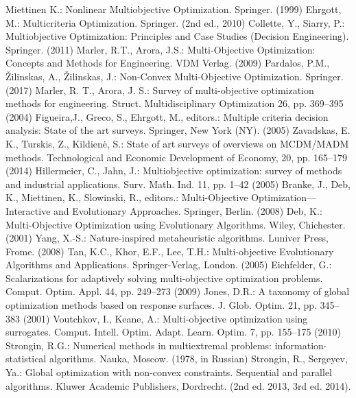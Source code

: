 \documentclass[smallextended]{svjour3}       %
\begin{document}
\begin{thebibliography}{}
%
%

 Miettinen K.: Nonlinear Multiobjective Optimization. Springer. (1999)
 Ehrgott, M.: Multicriteria Optimization. Springer. (2nd ed., 2010)
 Collette, Y., Siarry, P.: Multiobjective Optimization: Principles and Case Studies (Decision Engineering). Springer. (2011)
 Marler, R.T., Arora, J.S.: Multi-Objective Optimization: Concepts and Methods for Engineering. VDM Verlag. (2009)
 Pardalos, P.M., {\v Z}ilinskas, A., {\v Z}ilinskas, J.: Non-Convex Multi-Objective Optimization. Springer. (2017)
 Marler, R. T., Arora, J. S.: Survey of multi-objective optimization methods for engineering. Struct. Multidisciplinary Optimization 26, pp. 369--395 (2004)
 Figueira,J., Greco, S., Ehrgott, M., editors.: Multiple criteria decision analysis: State of the art surveys. Springer, New York (NY). (2005)
 Zavadskas, E. K., Turskis, Z., Kildien\.e, S.: State of art surveys of overviews on MCDM/MADM methods. Technological and Economic Development of Economy, 20, pp. 165--179 (2014)
 Hillermeier, C., Jahn, J.: Multiobjective optimization: survey of methods and industrial applications. Surv. Math. Ind. 11, pp. 1--42 (2005)
 Branke, J., Deb, K., Miettinen, K., Slowinski, R., editors.: Multi-Objective Optimization—Interactive and Evolutionary Approaches. Springer, Berlin. (2008)
 Deb, K.: Multi-Objective Optimization using Evolutionary Algorithms. Wiley, Chichester. (2001)
 Yang, X.-S.: Nature-inspired metaheuristic algorithms. Luniver Press, Frome. (2008) 
 Tan, K.C., Khor, E.F., Lee, T.H.: Multi-objective Evolutionary Algorithms and Applications. Springer-Verlag, London. (2005)
 Eichfelder, G.: Scalarizations for adaptively solving multi-objective optimization problems. Comput. Optim. Appl. 44, pp. 249--273 (2009)
 Jones, D.R.: A taxonomy of global optimization methods based on response surfaces. J. Glob. Optim. 21, pp. 345--383 (2001)
 Voutchkov, I., Keane, A.: Multi-objective optimization using surrogates. Comput. Intell. Optim. Adapt. Learn. Optim. 7, pp. 155--175 (2010)
 Strongin, R.G.: Numerical methods in multiextremal problems: information-statistical algorithms. Nauka, Moscow. (1978, in Russian) 
 Strongin, R., Sergeyev, Ya.: Global optimization with non-convex constraints. Sequential and parallel algorithms. Kluwer Academic Publishers, Dordrecht. (2nd ed. 2013, 3rd ed. 2014).

\end{thebibliography}
\end{document}
